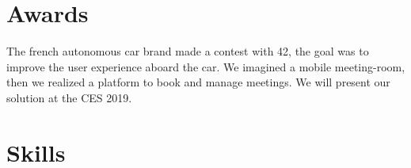 \documentclass[a4paper]{deedy-resume} %
\begin{document}


\section{Awards}




\sectionspace %


\begin{description}[leftmargin=0pt]
\item The french autonomous car brand made a contest with 42, the goal was to improve the user experience aboard the car. We imagined a mobile meeting-room, then we realized a platform to book and manage meetings. We will present our solution at the CES 2019.
\end{description}
\sectionspace %



\section{Skills}
\end{document}
